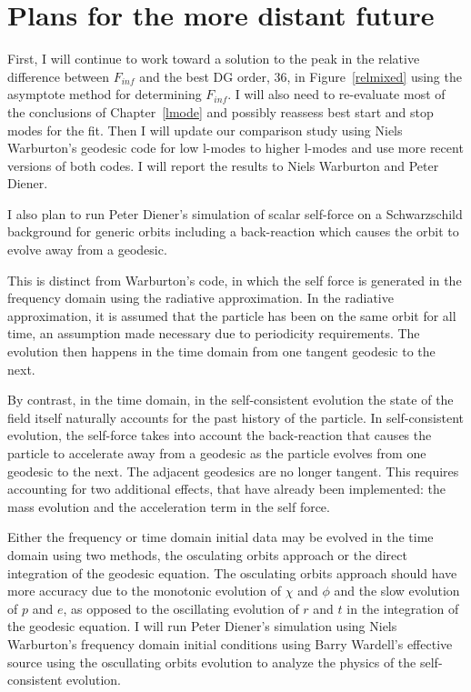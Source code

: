 \section{Plans for the more distant future}
First, I will continue to work toward a solution to the peak in the relative difference between $F_{inf}$ and the best DG order, 36, in Figure~\ref{relmixed} using the asymptote method for determining $F_{inf}$. I will also need to re-evaluate most of the conclusions of Chapter~\ref{lmode} and possibly reassess best start and stop modes for the fit. Then I will update our comparison study using Niels Warburton's geodesic code for low l-modes to higher l-modes and use more recent versions of both codes. I will report the results to Niels Warburton and Peter Diener. 

I also plan to run Peter Diener's simulation of scalar self-force on a Schwarzschild background for generic orbits including a back-reaction which causes the orbit to evolve away from a geodesic.

This is distinct from Warburton's code, in which the self force is generated in the frequency domain using the radiative approximation. In the radiative approximation, it is assumed that the particle has been on the same orbit for all time, an assumption made necessary due to periodicity requirements. The evolution then happens in the time domain from one tangent geodesic to the next.

By contrast, in the time domain, in the self-consistent evolution the state of the field itself naturally accounts for the past history of the particle. In self-consistent evolution, the self-force takes into account the back-reaction that causes the particle to accelerate away from a geodesic as the particle evolves from one geodesic to the next. The adjacent geodesics are no longer tangent. This requires accounting for two additional effects, that have already been implemented: the mass evolution and the acceleration term in the self force. 


Either the frequency or time domain initial data may be evolved in the time domain using two methods, the osculating orbits approach or the direct integration of the geodesic equation. The osculating orbits approach should have more accuracy due to the monotonic evolution of $\chi$ and $\phi$ and the slow evolution of $p$ and $e$, as opposed to the oscillating evolution of $r$ and $t$ in the integration of the geodesic equation. I will run Peter Diener's simulation using Niels Warburton's frequency domain initial conditions using Barry Wardell's effective source using the oscullating orbits evolution to analyze the physics of the self-consistent evolution. 


